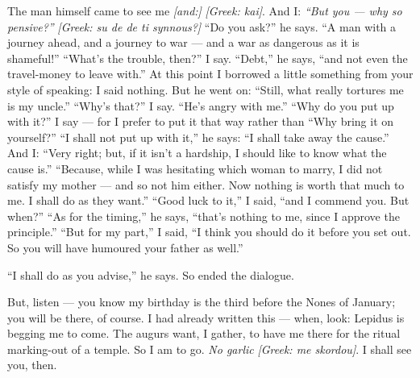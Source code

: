 

 The man himself came to see me \textit{[and:]} \textit{[Greek: kai]}. And I: \textit{``But you --- why so pensive?''} \textit{[Greek: su de de ti synnous?]} ``Do you ask?'' he says. ``A man with a journey ahead, and a journey to war --- and a war as dangerous as it is shameful!'' ``What's the trouble, then?'' I say. ``Debt,'' he says, ``and not even the travel-money to leave with.'' At this point I borrowed a little something from your style of speaking: I said nothing. But he went on: ``Still, what really tortures me is my uncle.'' ``Why's that?'' I say. ``He's angry with me.'' ``Why do you put up with it?'' I say --- for I prefer to put it that way rather than ``Why bring it on yourself?'' ``I shall not put up with it,'' he says: ``I shall take away the cause.'' And I: ``Very right; but, if it isn't a hardship, I should like to know what the cause is.'' ``Because, while I was hesitating which woman to marry, I did not satisfy my mother --- and so not him either. Now nothing is worth that much to me. I shall do as they want.'' ``Good luck to it,'' I said, ``and I commend you. But when?'' ``As for the timing,'' he says, ``that's nothing to me, since I approve the principle.'' ``But for my part,'' I said, ``I think you should do it before you set out. So you will have humoured your father as well.''

 ``I shall do as you advise,'' he says. So ended the dialogue.

 But, listen --- you know my birthday is the third before the Nones of January; you will be there, of course. I had already written this --- when, look: Lepidus is begging me to come. The augurs want, I gather, to have me there for the ritual marking-out of a temple. So I am to go. \textit{No garlic} \textit{[Greek: me skordou]}. I shall see you, then.
